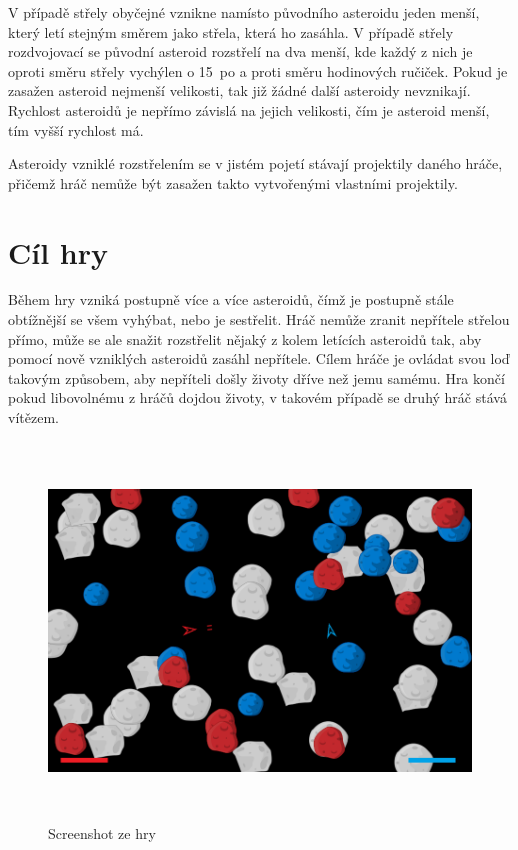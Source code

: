\par
V případě střely obyčejné vznikne namísto původního asteroidu jeden menší, který letí stejným směrem jako střela, která ho zasáhla.
V případě střely rozdvojovací se původní asteroid rozstřelí na dva menší, kde každý z nich je oproti směru střely vychýlen o 15\textdegree\ po a proti směru hodinových ručiček.
Pokud je zasažen asteroid nejmenší velikosti, tak již žádné další asteroidy nevznikají. 
Rychlost asteroidů je nepřímo závislá na jejich velikosti, čím je asteroid menší, tím vyšší rychlost má.
\par
Asteroidy vzniklé rozstřelením se v jistém pojetí stávají projektily daného hráče, přičemž hráč nemůže být zasažen takto vytvořenými vlastními projektily.




\section{Cíl hry}
Během hry vzniká postupně více a více asteroidů, čímž je postupně stále obtížnější se všem vyhýbat, nebo je sestřelit.
Hráč nemůže zranit nepřítele střelou přímo, může se ale snažit rozstřelit nějaký z kolem letících asteroidů tak, aby pomocí nově vzniklých asteroidů zasáhl nepřítele.
Cílem hráče je ovládat svou loď takovým způsobem, aby nepříteli došly životy dříve než jemu samému. Hra končí pokud libovolnému z hráčů dojdou životy, v takovém případě se druhý hráč stává vítězem.

\begin{figure}[H]

    \includegraphics[width=145mm, height=100mm]{./Obrazky/UkazkaHry.png}
    \caption{Screenshot ze hry}
    \label{obr01:}
    \end{figure}